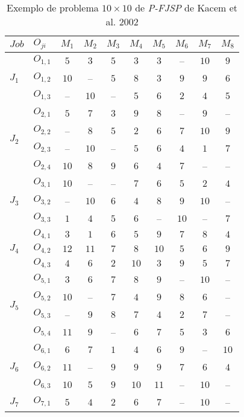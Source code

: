 \begin{table}[htb]
  \centering
  \caption{Exemplo de problema $10\times10$ de \textit{P-FJSP} de Kacem et al. 2002}
  \label{fig:ex-instancia-problema-PFJSP}
  \begin{tabular}{llcccccccc}
\hline
$Job$ & $O_{ji}$  & $M_1$ & $M_2$ & $M_3$ & $M_4$ & $M_5$ & $M_6$ & $M_7$ & $M_8$ \\
\hline
\multirow{3}{*}{$J_{1}$} & $O_{1,1}$ & $5$ & $3$ & $5$ & $3$ & $3$ & -- & $10$ & $9$\\
& $O_{1,2}$ & $10$ & -- & $5$ & $8$ & $3$ & $9$ & $9$ & $6$\\
& $O_{1,3}$ & -- & $10$ & -- & $5$ & $6$ & $2$ & $4$ & $5$\\
\multirow{4}{*}{$J_{2}$} & $O_{2,1}$ & $5$ & $7$ & $3$ & $9$ & $8$ & -- & $9$ & --\\
& $O_{2,2}$ & -- & $8$ & $5$ & $2$ & $6$ & $7$ & $10$ & $9$\\
& $O_{2,3}$ & -- & $10$ & -- & $5$ & $6$ & $4$ & $1$ & $7$\\
& $O_{2,4}$ & $10$ & $8$ & $9$ & $6$ & $4$ & $7$ & -- & --\\
\multirow{3}{*}{$J_{3}$} & $O_{3,1}$ & $10$ & -- & -- & $7$ & $6$ & $5$ & $2$ & $4$\\
& $O_{3,2}$ & -- & $10$ & $6$ & $4$ & $8$ & $9$ & $10$ & --\\
& $O_{3,3}$ & $1$ & $4$ & $5$ & $6$ & -- & $10$ & -- & $7$\\
\multirow{3}{*}{$J_{4}$} & $O_{4,1}$ & $3$ & $1$ & $6$ & $5$ & $9$ & $7$ & $8$ & $4$\\
& $O_{4,2}$ & $12$ & $11$ & $7$ & $8$ & $10$ & $5$ & $6$ & $9$\\
& $O_{4,3}$ & $4$ & $6$ & $2$ & $10$ & $3$ & $9$ & $5$ & $7$\\
\multirow{4}{*}{$J_{5}$} & $O_{5,1}$ & $3$ & $6$ & $7$ & $8$ & $9$ & -- & $10$ & --\\
& $O_{5,2}$ & $10$ & -- & $7$ & $4$ & $9$ & $8$ & $6$ & --\\
& $O_{5,3}$ & -- & $9$ & $8$ & $7$ & $4$ & $2$ & $7$ & --\\
& $O_{5,4}$ & $11$ & $9$ & -- & $6$ & $7$ & $5$ & $3$ & $6$\\
\multirow{3}{*}{$J_{6}$} & $O_{6,1}$ & $6$ & $7$ & $1$ & $4$ & $6$ & $9$ & -- & $10$\\
& $O_{6,2}$ & $11$ & -- & $9$ & $9$ & $9$ & $7$ & $6$ & $4$\\
& $O_{6,3}$ & $10$ & $5$ & $9$ & $10$ & $11$ & -- & $10$ & --\\
\multirow{3}{*}{$J_{7}$} & $O_{7,1}$ & $5$ & $4$ & $2$ & $6$ & $7$ & -- & $10$ & --\\

\end{tabular}
\end{table}
